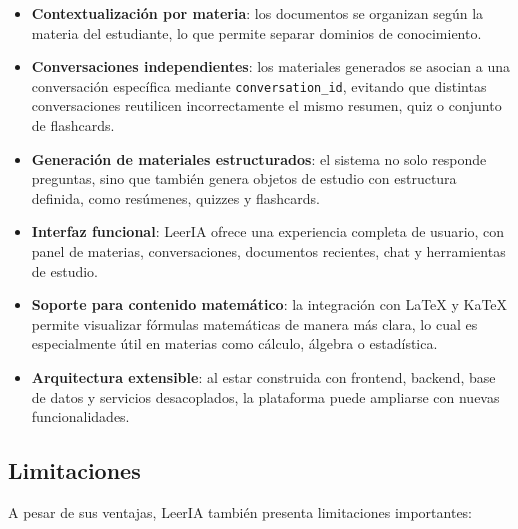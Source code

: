 \documentclass[12pt, letterpaper]{article}
\begin{document}
	\begin{itemize}
		\item \textbf{Contextualización por materia}: los documentos se organizan según la materia del estudiante, lo que permite separar dominios de conocimiento.
		
		\item \textbf{Conversaciones independientes}: los materiales generados se asocian a una conversación específica mediante \texttt{conversation\_id}, evitando que distintas conversaciones reutilicen incorrectamente el mismo resumen, quiz o conjunto de flashcards.
		
		\item \textbf{Generación de materiales estructurados}: el sistema no solo responde preguntas, sino que también genera objetos de estudio con estructura definida, como resúmenes, quizzes y flashcards.
		
		\item \textbf{Interfaz funcional}: LeerIA ofrece una experiencia completa de usuario, con panel de materias, conversaciones, documentos recientes, chat y herramientas de estudio.
		
		\item \textbf{Soporte para contenido matemático}: la integración con LaTeX y KaTeX permite visualizar fórmulas matemáticas de manera más clara, lo cual es especialmente útil en materias como cálculo, álgebra o estadística.
		
		\item \textbf{Arquitectura extensible}: al estar construida con frontend, backend, base de datos y servicios desacoplados, la plataforma puede ampliarse con nuevas funcionalidades.
	\end{itemize}
	
	\subsection{Limitaciones}
	
	A pesar de sus ventajas, LeerIA también presenta limitaciones importantes:
	
\end{document}
